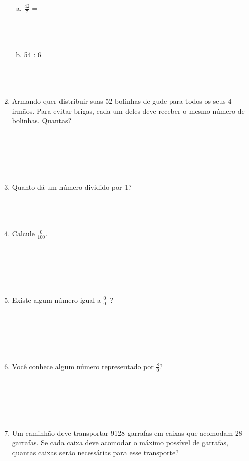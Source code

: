 \documentclass[a4paper,14pt]{article}
\begin{document}
\begin{multicols}{2}
\begin{enumerate}
\begin{enumerate}[a)]
    				\item $\frac{42}{7} = $ \\\\\\\\
    				\item 54 : 6 = \\\\\\\\
    			\end{enumerate}
    			\item Armando quer distribuir suas 52 bolinhas de gude para todos os seus 4 irmãos. Para evitar brigas, cada um deles deve receber o mesmo número de bolinhas. Quantas? \\\\\\\\\\\\
    			\item Quanto dá um número dividido por 1? \\\\\\\\
    			\item Calcule $\frac{0}{100}$. \\\\\\\\\\\\
    			\item Existe algum número igual a $\frac{0}{0}$~? \\\\\\\\\\\\
    			\item Você conhece algum número representado por $\frac{8}{0}$? \\\\\\\\\\\\
    			\item Um caminhão deve transportar 9128 garrafas em caixas que acomodam 28 garrafas. Se cada caixa deve acomodar o máximo possível de garrafas, quantas caixas serão necessárias para esse transporte? \\\\\\\\\\\\

\end{enumerate}
\end{multicols}
\end{document}
